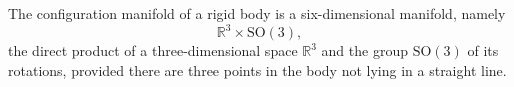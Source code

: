 The configuration manifold of a rigid body is a six-dimensional manifold, namely
$$
\mathbb{R}^3 \times \text{SO}(3),
$$
the direct product of a three-dimensional space $\mathbb{R}^3$ and the group $\text{SO}(3)$ of its rotations, provided there are three points in the body not lying in a straight line.
